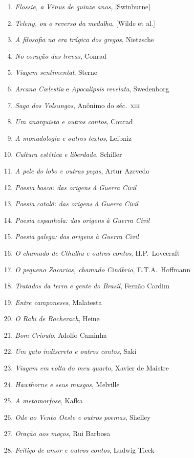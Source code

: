 \begin{enumerate}
\item \textit{Flossie, a Vênus de quinze anos}, [Swinburne]
\item \textit{Teleny, ou o reverso da medalha}, [Wilde et al.]
\item \textit{A filosofia na era trágica dos gregos}, Nietzsche
\item \textit{No coração das trevas}, Conrad
\item \textit{Viagem sentimental}, Sterne
\item \textit{Arcana C\oe lestia} e \textit{Apocalipsis revelata}, Swedenborg
\item \textit{Saga dos Volsungos}, Anônimo do séc.~\textsc{xiii}
\item \textit{Um anarquista e outros contos}, Conrad
\item \textit{A monadologia e outros textos}, Leibniz
\item \textit{Cultura estética e liberdade}, Schiller
\item \textit{A pele do lobo e outras peças}, Artur Azevedo
\item \textit{Poesia basca: das origens à Guerra Civil} 
\item \textit{Poesia catalã: das origens à Guerra Civil} 
\item \textit{Poesia espanhola: das origens à Guerra Civil} 
\item \textit{Poesia galega: das origens à Guerra Civil} 
\item \textit{O chamado de Cthulhu e outros contos}, H.P.~Lovecraft 
\item \textit{O pequeno Zacarias, chamado Cinábrio}, E.T.A.~Hoffmann
\item \textit{Tratados da terra e gente do Brasil}, Fernão Cardim 
\item \textit{Entre camponeses}, Malatesta
\item \textit{O Rabi de Bacherach}, Heine
\item \textit{Bom Crioulo}, Adolfo Caminha
\item \textit{Um gato indiscreto e outros contos}, Saki
\item \textit{Viagem em volta do meu quarto}, Xavier de Maistre 
\item \textit{Hawthorne e seus musgos}, Melville
\item \textit{A metamorfose}, Kafka
\item \textit{Ode ao Vento Oeste e outros poemas}, Shelley
\item \textit{Oração aos moços}, Rui Barbosa
\item \textit{Feitiço de amor e outros contos}, Ludwig Tieck

\end{enumerate}
